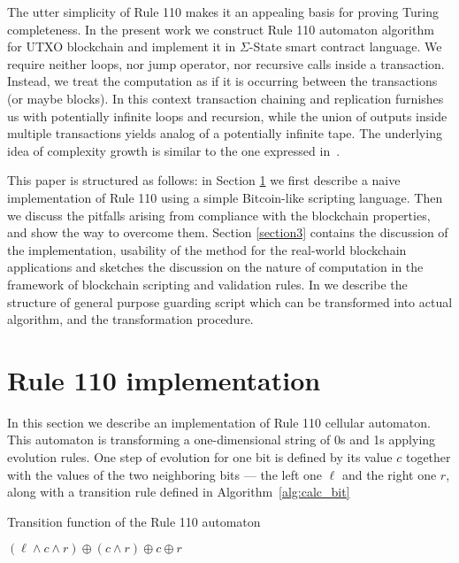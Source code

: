 \documentclass[runningheads]{llncs}
\begin{document}
    The utter simplicity of Rule 110 makes it an appealing basis for proving Turing completeness. 
    In the present work we construct Rule 110 automaton algorithm for UTXO blockchain
    and implement it in $\Sigma$-State smart contract language\cite{chepurnoy2017sigma}.
    We require neither loops, nor jump
    operator, nor recursive calls inside a transaction. Instead, we treat the
    computation as if it is occurring between the transactions (or maybe
    blocks). In this context transaction chaining and replication furnishes us
    with potentially infinite loops and recursion, while the union of outputs
    inside multiple transactions yields analog of a potentially infinite tape.
    The underlying idea of complexity growth is similar to the one expressed
    in~\cite{von1951general,von1966theory}.

    This paper is structured as follows: in Section \ref{section2} we first
    describe a naive implementation of Rule 110 using a simple Bitcoin-like
    scripting language.  Then we discuss the pitfalls arising from compliance
    with the blockchain properties, and show the way to overcome them.  Section
    \ref{section3} contains the discussion of the implementation, usability of
    the method for the real-world blockchain applications and sketches the
    discussion on the nature of computation in the framework of blockchain
    scripting and validation rules.
    In  we describe the structure of general purpose guarding script
    which can be transformed into actual algorithm, and the transformation procedure.
    
    \section{Rule 110 implementation}
    \label{section2}

    In this section we describe an implementation of Rule 110 cellular automaton. This automaton
    is transforming a one-dimensional string of 0s and 1s applying evolution rules. One
    step of evolution for one bit is defined by its value $c$ together with the
    values of the two neighboring bits --- the left one $\ell$ and the right one $r$, along with a 
    transition rule defined in Algorithm~\ref{alg:calc_bit}

    \begin{algorithm}[H]
        \caption{Transition function of the Rule 110 automaton}
        \label{alg:calc_bit}
        \begin{algorithmic}[1]
            \State
            \Return $(\ell\wedge c\wedge r) \oplus (c\wedge r) \oplus c \oplus r$
            \EndFunction
        \end{algorithmic}
    \end{algorithm}
\end{document}
